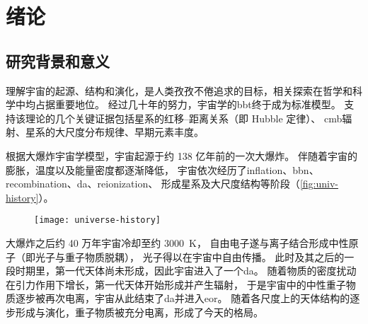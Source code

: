 
\chapter{绪论}
\label{chap:introduction}

\section{研究背景和意义}

理解宇宙的起源、结构和演化，是人类孜孜不倦追求的目标，相关探索在哲学和科学中均占据重要地位。
经过几十年的努力，宇宙学的\ac{bbt}终于成为标准模型。
支持该理论的几个关键证据包括星系的红移--距离关系（即 Hubble 定律）、
\ac{cmb}辐射、星系的大尺度分布规律、早期元素丰度。

根据大爆炸宇宙学模型，宇宙起源于约 138 亿年前的一次大爆炸。
伴随着宇宙的膨胀，温度以及能量密度都逐渐降低，
宇宙依次经历了\ac{inflation}、\ac{bbn}、
\ac{recombination}、\ac{da}、\ac{reionization}、
形成星系及大尺度结构等阶段（\autoref{fig:univ-history}）。

\begin{figure}[htp]
  \centering
  \texttt{[image: universe-history]}
  \label{fig:univ-history}
\end{figure}

大爆炸之后约 40 万年宇宙冷却至约 \SI{3000}{\kelvin}，
自由电子遂与离子结合形成中性原子（即光子与重子物质脱耦），
光子得以在宇宙中自由传播。
此时及其之后的一段时期里，第一代天体尚未形成，因此宇宙进入了一个\ac{da}。
随着物质的密度扰动在引力作用下增长，第一代天体开始形成并产生辐射，
于是宇宙中的中性重子物质逐步被再次电离，宇宙从此结束了\ac{da}并进入\ac{eor}。
随着各尺度上的天体结构的逐步形成与演化，重子物质被充分电离，形成了今天的格局。

